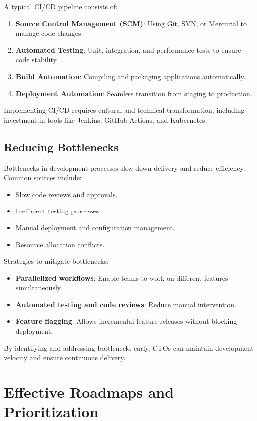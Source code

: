 A typical CI/CD pipeline consists of:
\begin{enumerate}
    \item \textbf{Source Control Management (SCM)}: Using Git, SVN, or Mercurial to manage code changes.
    \item \textbf{Automated Testing}: Unit, integration, and performance tests to ensure code stability.
    \item \textbf{Build Automation}: Compiling and packaging applications automatically.
    \item \textbf{Deployment Automation}: Seamless transition from staging to production.
\end{enumerate}

Implementing CI/CD requires cultural and technical transformation, including investment in tools like Jenkins, GitHub Actions, and Kubernetes.

\subsection{Reducing Bottlenecks}
Bottlenecks in development processes slow down delivery and reduce efficiency. Common sources include:

\begin{itemize}
    \item Slow code reviews and approvals.
    \item Inefficient testing processes.
    \item Manual deployment and configuration management.
    \item Resource allocation conflicts.
\end{itemize}

Strategies to mitigate bottlenecks:
\begin{itemize}
    \item \textbf{Parallelized workflows}: Enable teams to work on different features simultaneously.
    \item \textbf{Automated testing and code reviews}: Reduce manual intervention.
    \item \textbf{Feature flagging}: Allows incremental feature releases without blocking deployment.
\end{itemize}

By identifying and addressing bottlenecks early, CTOs can maintain development velocity and ensure continuous delivery.

\section{Effective Roadmaps and Prioritization}

